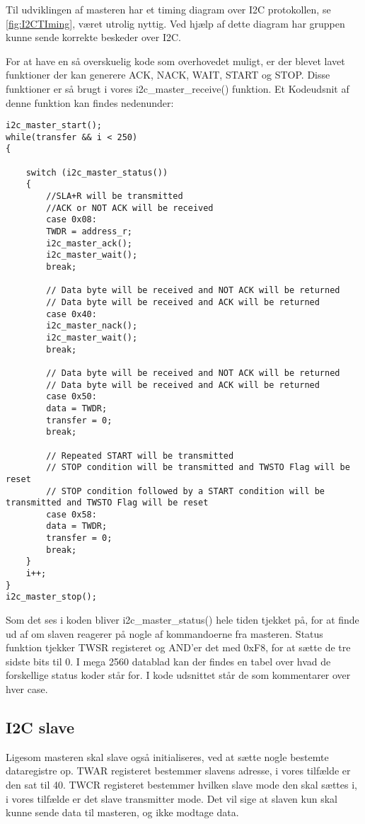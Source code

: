 Til udviklingen af masteren har et timing diagram over I2C protokollen, se \autoref{fig:I2CTIming}, været utrolig nyttig. Ved hjælp af dette diagram har gruppen kunne sende korrekte beskeder over I2C. 

For at have en så overskuelig kode som overhovedet muligt, er der blevet lavet funktioner der kan generere ACK, NACK, WAIT, START og STOP. Disse funktioner er så brugt i vores i2c\_master\_receive() funktion. Et Kodeudsnit af denne funktion kan findes nedenunder:

\newpage

\begin{lstlisting}
i2c_master_start();
while(transfer && i < 250)
{
	
	switch (i2c_master_status())
	{
		//SLA+R will be transmitted
		//ACK or NOT ACK will be received
		case 0x08:
		TWDR = address_r;
		i2c_master_ack();
		i2c_master_wait();
		break;
		
		// Data byte will be received and NOT ACK will be returned
		// Data byte will be received and ACK will be returned
		case 0x40:
		i2c_master_nack();
		i2c_master_wait();
		break;
		
		// Data byte will be received and NOT ACK will be returned
		// Data byte will be received and ACK will be returned
		case 0x50:
		data = TWDR;
		transfer = 0;
		break;
		
		// Repeated START will be transmitted
		// STOP condition will be transmitted and TWSTO Flag will be reset
		// STOP condition followed by a START condition will be transmitted and TWSTO Flag will be reset
		case 0x58:
		data = TWDR;
		transfer = 0;
		break;
	}
	i++;
}
i2c_master_stop();
\end{lstlisting}

Som det ses i koden bliver i2c\_master\_status() hele tiden tjekket på, for at finde ud af om slaven reagerer på nogle af kommandoerne fra masteren. Status funktion tjekker TWSR registeret og AND'er det med 0xF8, for at sætte de tre sidste bits til 0. I mega 2560 datablad kan der findes en tabel over hvad de forskellige status koder står for\cite{man:mega2560Kap24}. I kode udsnittet står de som kommentarer over hver case.

\subsection{I2C slave}
Ligesom masteren skal slave også initialiseres, ved at sætte nogle bestemte dataregistre op. TWAR registeret bestemmer slavens adresse, i vores tilfælde er den sat til 40. TWCR registeret bestemmer hvilken slave mode den skal sættes i, i vores tilfælde er det slave transmitter mode. Det vil sige at slaven kun skal kunne sende data til masteren, og ikke modtage data. 

